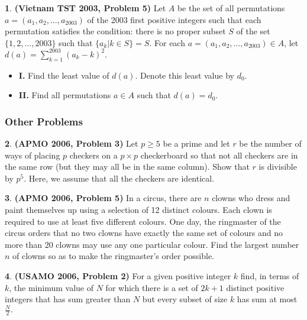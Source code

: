 \documentclass{article}
\theoremstyle{definition}
\newtheorem{p}{}
\begin{document}
\begin{p}{\bf(Vietnam TST 2003, Problem 5)}
Let $A$ be the set of all permutations $a = (a_1, a_2, \ldots, a_{2003})$ of the 2003 first positive integers such that each permutation satisfies the condition: there is no proper subset $S$ of the set $\{1, 2, \ldots, 2003\}$ such that $\{a_k | k \in S\} = S.$
For each $a = (a_1, a_2, \ldots, a_{2003}) \in A$, let $d(a) = \sum^{2003}_{k=1} \left(a_k - k \right)^2.$
\begin{itemize}
\item {\bf I.} Find the least value of $d(a)$. Denote this least value by $d_0$.
\item {\bf II.} Find all permutations $a \in A$ such that $d(a) = d_0$.
\end{itemize}
\end{p}




\subsubsection{Other Problems}



\begin{p}{\bf (APMO 2006, Problem 3)}
Let $p\ge5$ be a prime and let $r$ be the number of ways of placing $p$ checkers on a $p\times p$ checkerboard so that not all checkers are in the same row (but they may all be in the same column). Show that $r$ is divisible by $p^5$. Here, we assume that all the checkers are identical.
\end{p}





\begin{p}{\bf (APMO 2006, Problem 5)}
In a circus, there are $n$ clowns who dress and paint themselves up using a selection of 12 distinct colours. Each clown is required to use at least five different colours. One day, the ringmaster of the circus orders that no two clowns have exactly the same set of colours and no more than 20 clowns may use any one particular colour. Find the largest number $n$ of clowns so as to make the ringmaster's order possible.
\end{p}





\begin{p}{\bf (USAMO 2006, Problem 2)}
For a given positive integer $k$ find, in terms of $k$, the minimum value of $N$ for which there is a set of $2k + 1$ distinct positive integers that has sum greater than $N$ but every subset of size $k$ has sum at most $\frac{N}{2}.$
\end{p}
\end{document}
